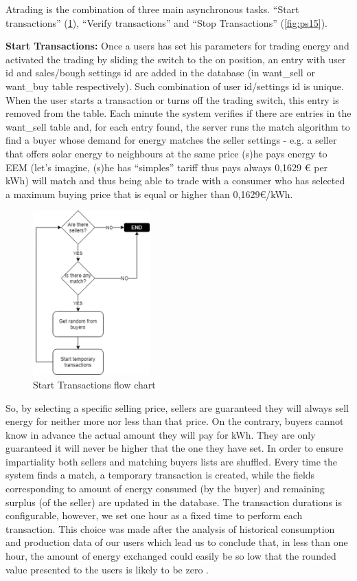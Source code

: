 Atrading is the combination of three main asynchronous tasks. “Start transactions” (\cref{fig:ps13}), “Verify transactions” and “Stop Transactions” (\cref{fig:ps15}).

\textbf{Start Transactions:} Once a users has set his parameters for trading energy and activated the trading by sliding the switch to the on position, an entry with user id and sales/bough settings id are added in the database (in want\_sell or want\_buy table respectively). Such combination of user id/settings id is unique. When the user starts a transaction or turns off the trading switch, this entry is removed from the table. Each minute the system verifies if there are entries in the want\_sell table and, for each entry found, the server runs the match algorithm to find a buyer whose demand for energy matches the seller settings - e.g. a seller that offers solar energy to neighbours at the same price (s)he pays energy to EEM (let’s imagine, (s)he has “simples” tariff thus pays always 0,1629 € per kWh) will match and thus being able to trade with a consumer who has selected a maximum buying price that is equal or higher than 0,1629€/kWh. 

\begin{figure}[h]
\centering
\includegraphics[width=0.4\textwidth]{./Images/ps13}
\caption{Start Transactions flow chart}
\label{fig:ps13}
\end{figure}

So, by selecting a specific selling price, sellers are guaranteed they will always sell energy for neither more nor less than that price. On the contrary, buyers cannot know in advance the actual amount they will pay for kWh. They are only guaranteed it will never be higher that the one they have set. In order to ensure impartiality both sellers and matching buyers lists are shuffled. Every time the system finds a match, a temporary transaction is created, while the fields corresponding to  amount of energy consumed (by the buyer)  and remaining surplus (of the seller) are updated in the database. The transaction durations is configurable, however, we set one hour as a fixed time to perform each transaction. This choice was made after the analysis of historical consumption and production data of our users which lead us to conclude that, in less than one hour, the amount of energy exchanged could easily be so low  that the rounded value presented to the users is likely to be zero . 





